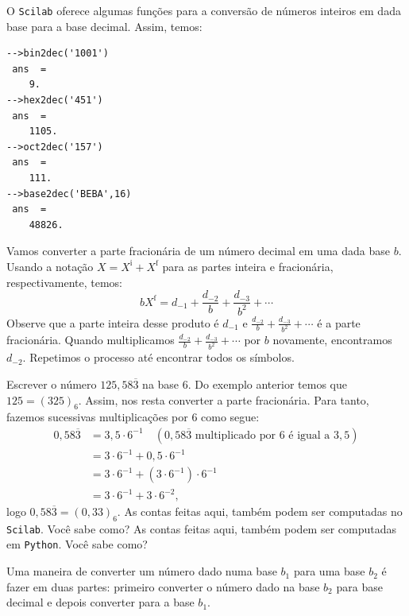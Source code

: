 \ifisscilab
\begin{ex}[Scilab]
  O \verb+Scilab+ oferece algumas funções para a conversão de números inteiros em dada base para a base decimal. Assim, temos:
\begin{verbatim}
-->bin2dec('1001')
 ans  =
    9.  
-->hex2dec('451')
 ans  =
    1105.  
-->oct2dec('157')
 ans  =
    111.
-->base2dec('BEBA',16)
 ans  =
    48826.  
\end{verbatim}
\end{ex}
\fi

Vamos converter a parte fracionária de um número decimal em uma dada base $b$. Usando a notação $X = X^{\mbox{i}} + X^{\mbox{f}}$ para as partes inteira e fracionária, respectivamente, temos:
\begin{equation*}
  bX^{\mbox{f}}=d_{-1}+\frac{d_{-2}}{b}+\frac{d_{-3}}{b^2}+\cdots  
\end{equation*}
Observe que a parte inteira desse produto é $d_{-1}$ e $\frac{d_{-2}}{b}+\frac{d_{-3}}{b^2}+\cdots$ é a parte fracionária. Quando multiplicamos $\frac{d_{-2}}{b}+\frac{d_{-3}}{b^2}+\cdots$ por $b$ novamente, encontramos $d_{-2}$. Repetimos o processo até encontrar todos os símbolos.

\begin{ex} Escrever o número $125,58\overline{3}$ na base $6$. Do exemplo anterior temos que $125=(325)_6$. Assim, nos resta converter a parte fracionária. Para tanto, fazemos sucessivas multiplicações por $6$ como segue:
  \begin{equation*}
    \begin{split}
    0,58\overline{3} &= 3,5\cdot 6^{-1}\quad(\mbox{$0,58\overline{3}$ multiplicado por $6$ é igual a $3,5$})\\
    &= 3\cdot 6^{-1} + 0,5\cdot 6^{-1}\\
    &= 3\cdot 6^{-1} + (3\cdot 6^{-1})\cdot 6^{-1}\\
    &= 3\cdot 6^{-1} + 3\cdot 6^{-2},      
    \end{split}
  \end{equation*}
logo $0,58\overline{3} = (0,33)_6$.
\ifisscilab
As contas feitas aqui, também podem ser computadas no \verb+Scilab+. Você sabe como?
\fi
\ifispython
As contas feitas aqui, também podem ser computadas em \verb+Python+. Você sabe como?
\fi
\end{ex}

Uma maneira de converter um número dado numa base $b_1$ para uma base $b_2$ é fazer em duas partes: primeiro converter o número dado na base $b_2$ para base decimal e depois converter para a base $b_1$.

